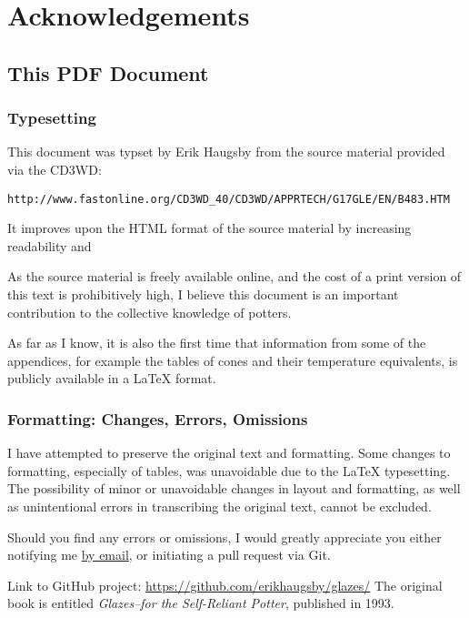 \chapter*{Acknowledgements}
\section*{This PDF Document}
\subsection*{Typesetting}
This document was typset by Erik Haugsby from the source material provided 
via the CD3WD:
\begin{verbatim}
http://www.fastonline.org/CD3WD_40/CD3WD/APPRTECH/G17GLE/EN/B483.HTM
\end{verbatim}
It improves upon the HTML format of the source material by increasing 
readability and 

As the source material is freely available online, and the cost of a print 
version of this text is prohibitively high, I believe this document is an 
important contribution to the collective knowledge of potters.

As far as I know, it is also the first time that information from some of the 
appendices, for example the tables of cones and their temperature equivalents, 
is publicly available in a LaTeX format.
\subsection*{Formatting: Changes, Errors, Omissions}
I have attempted to preserve the original text and formatting. Some changes to 
formatting, especially of tables, was unavoidable due to the LaTeX typesetting. 
The possibility of minor or unavoidable changes in layout and formatting, as 
well as unintentional errors in transcribing the original text, cannot be 
excluded.

Should you find any errors or omissions, I would greatly appreciate you either 
notifying me \href{mailto:e@erikhaugsby.com}{by email}, or initiating a pull 
request via Git. 

Link to GitHub project: 
\href{https://github.com/erikhaugsby/glazes/}{https://github.com/erikhaugsby/glazes/}
The original book is entitled \textit{Glazes--for the Self-Reliant Potter}, 
published in 1993.
